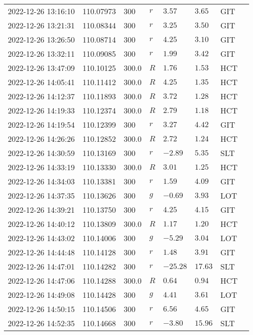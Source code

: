 \documentclass{nature_plusfigure}
\begin{document}
\begin{supplement}
\begin{center}
\begin{longtable}{llllllll}
2022-12-26 13:16:10 & 110.07973 & 300 & $r$ & $3.57$ & $3.65$ & GIT &  \\ 
2022-12-26 13:21:31 & 110.08344 & 300 & $r$ & $3.25$ & $3.50$ & GIT &  \\ 
2022-12-26 13:26:50 & 110.08714 & 300 & $r$ & $4.25$ & $3.10$ & GIT &  \\ 
2022-12-26 13:32:11 & 110.09085 & 300 & $r$ & $1.99$ & $3.42$ & GIT &  \\ 
2022-12-26 13:47:09 & 110.10125 & 300.0 & $R$ & $1.76$ & $1.53$ & HCT &  \\ 
2022-12-26 14:05:41 & 110.11412 & 300.0 & $R$ & $4.25$ & $1.35$ & HCT &  \\ 
2022-12-26 14:12:37 & 110.11893 & 300.0 & $R$ & $3.72$ & $1.28$ & HCT &  \\ 
2022-12-26 14:19:33 & 110.12374 & 300.0 & $R$ & $2.79$ & $1.18$ & HCT &  \\ 
2022-12-26 14:19:54 & 110.12399 & 300 & $r$ & $3.27$ & $4.42$ & GIT &  \\ 
2022-12-26 14:26:26 & 110.12852 & 300.0 & $R$ & $2.72$ & $1.24$ & HCT &  \\ 
2022-12-26 14:30:59 & 110.13169 & 300 & $r$ & $-2.89$ & $5.35$ & SLT &  \\ 
2022-12-26 14:33:19 & 110.13330 & 300.0 & $R$ & $3.01$ & $1.25$ & HCT &  \\ 
2022-12-26 14:34:03 & 110.13381 & 300 & $r$ & $1.59$ & $4.09$ & GIT &  \\ 
2022-12-26 14:37:35 & 110.13626 & 300 & $g$ & $-0.69$ & $3.93$ & LOT &  \\ 
2022-12-26 14:39:21 & 110.13750 & 300 & $r$ & $4.25$ & $4.15$ & GIT &  \\ 
2022-12-26 14:40:12 & 110.13809 & 300.0 & $R$ & $1.17$ & $1.20$ & HCT &  \\ 
2022-12-26 14:43:02 & 110.14006 & 300 & $g$ & $-5.29$ & $3.04$ & LOT &  \\ 
2022-12-26 14:44:48 & 110.14128 & 300 & $r$ & $1.48$ & $3.91$ & GIT &  \\ 
2022-12-26 14:47:01 & 110.14282 & 300 & $r$ & $-25.28$ & $17.63$ & SLT &  \\ 
2022-12-26 14:47:06 & 110.14288 & 300.0 & $R$ & $0.64$ & $0.94$ & HCT &  \\ 
2022-12-26 14:49:08 & 110.14428 & 300 & $g$ & $4.41$ & $3.61$ & LOT &  \\ 
2022-12-26 14:50:15 & 110.14506 & 300 & $r$ & $6.56$ & $4.65$ & GIT &  \\ 
2022-12-26 14:52:35 & 110.14668 & 300 & $r$ & $-3.80$ & $15.96$ & SLT &  \\ 

\end{longtable}
\end{center}
\end{supplement}
\end{document}
